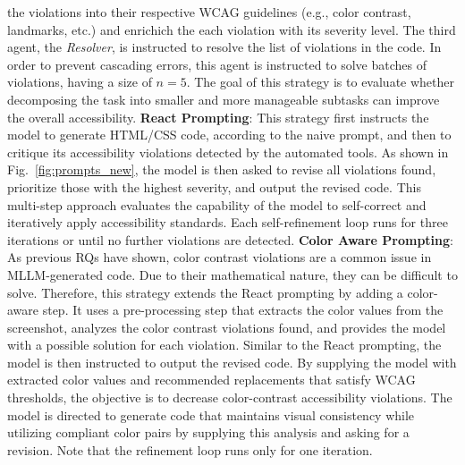   the violations into their respective WCAG guidelines (e.g., 
  color contrast, landmarks, etc.) and enrichich the each violation with 
  its severity level. The third agent, the \textit{Resolver}, is 
  instructed to resolve the list of violations in the code. In order to 
  prevent cascading errors, this agent is instructed to solve batches 
  of violations, having a size of \(n = 5\). The goal of this strategy 
  is to evaluate whether decomposing the task into smaller and more 
  manageable subtasks can improve the overall accessibility.\newline\newline
\textbf{React Prompting}: 
  This strategy first instructs the model to generate HTML/CSS code, 
  according to the naive prompt, and then to critique its accessibility
  violations detected by the automated tools. As shown in 
  Fig.~\ref{fig:prompts_new}, the model is then asked to revise
  all violations found, prioritize those with the highest 
  severity, and output the revised code.
  This multi-step approach evaluates the capability of the model to 
  self-correct and iteratively apply accessibility standards. 
  Each self-refinement loop runs for three iterations or until 
  no further violations are detected.\newline\newline
\textbf{Color Aware Prompting}: 
  As previous RQs have shown, color contrast violations are a common 
  issue in MLLM-generated code. Due to their mathematical nature, they
  can be difficult to solve. Therefore, this strategy extends the React 
  prompting by adding a color-aware step. It uses a pre-processing 
  step that extracts the color values from the screenshot, analyzes 
  the color contrast violations found, and provides the model with a 
  possible solution for each violation. Similar to the React prompting,
  the model is then instructed to output the revised code. 
  By supplying the model with extracted color values and recommended 
  replacements that satisfy WCAG thresholds, the objective is to 
  decrease color-contrast accessibility violations. The model is 
  directed to generate code that maintains visual consistency while 
  utilizing compliant color pairs by supplying this analysis and 
  asking for a revision.
  Note that the refinement loop runs only for one iteration.\newline




